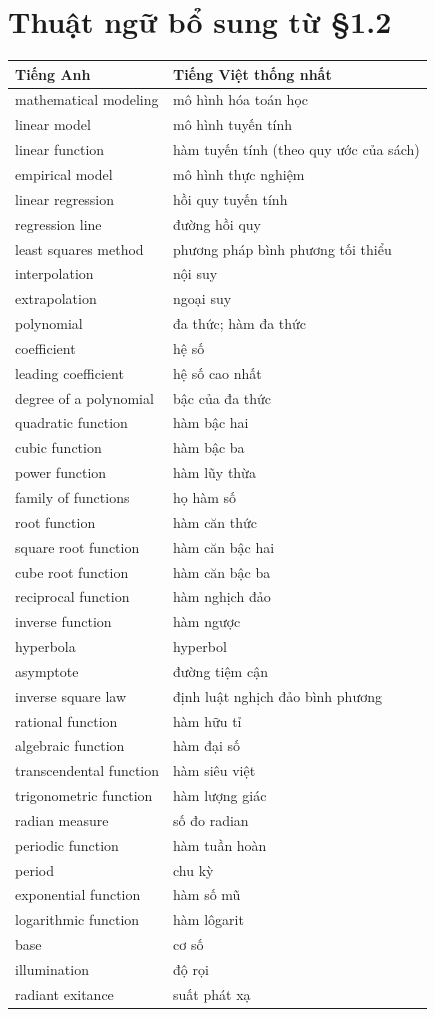 \documentclass[12pt,a4paper]{article}
\begin{document}
\section*{Thuật ngữ bổ sung từ §1.2}
\begin{longtable}{p{.43\linewidth}p{.49\linewidth}}\toprule Tiếng Anh&Tiếng Việt thống nhất\\\midrule\endhead
mathematical modeling&mô hình hóa toán học\\
linear model&mô hình tuyến tính\\
linear function&hàm tuyến tính (theo quy ước của sách)\\
empirical model&mô hình thực nghiệm\\
linear regression&hồi quy tuyến tính\\
regression line&đường hồi quy\\
least squares method&phương pháp bình phương tối thiểu\\
interpolation&nội suy\\
extrapolation&ngoại suy\\
polynomial&đa thức; hàm đa thức\\
coefficient&hệ số\\
leading coefficient&hệ số cao nhất\\
degree of a polynomial&bậc của đa thức\\
quadratic function&hàm bậc hai\\
cubic function&hàm bậc ba\\
power function&hàm lũy thừa\\
family of functions&họ hàm số\\
root function&hàm căn thức\\
square root function&hàm căn bậc hai\\
cube root function&hàm căn bậc ba\\
reciprocal function&hàm nghịch đảo\\
inverse function&hàm ngược\\
hyperbola&hyperbol\\
asymptote&đường tiệm cận\\
inverse square law&định luật nghịch đảo bình phương\\
rational function&hàm hữu tỉ\\
algebraic function&hàm đại số\\
transcendental function&hàm siêu việt\\
trigonometric function&hàm lượng giác\\
radian measure&số đo radian\\
periodic function&hàm tuần hoàn\\
period&chu kỳ\\
exponential function&hàm số mũ\\
logarithmic function&hàm lôgarit\\
base&cơ số\\
illumination&độ rọi\\
radiant exitance&suất phát xạ\\
\bottomrule\end{longtable}
\end{document}
